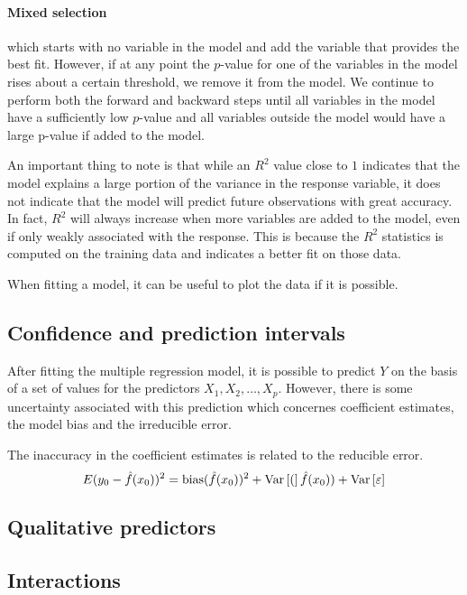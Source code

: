 \paragraph*{Mixed selection} which starts with no variable in the model and add the variable that provides the best fit. However, if at any point the $p$-value for one of the variables in the model rises about a certain threshold, we remove it from the model. We continue to perform both the forward and backward steps until all variables in the model have a sufficiently low $p$-value and all variables outside the model would have a large p-value if added to the model.

An important thing to note is that while an $R^2$ value close to $1$ indicates that the model explains a large portion of the variance in the response variable, it does not indicate that the model will predict future observations with great accuracy. In fact, $R^2$ will always increase when more variables are added to the model, even if only weakly associated with the response. This is because the $R^2$ statistics is computed on the training data and indicates a better fit on those data.

When fitting a model, it can be useful to plot the data if it is possible.

\subsection*{Confidence and prediction intervals}
After fitting the multiple regression model, it is possible to predict $Y$ on the basis of a set of values for the predictors $X_1, X_2, \dots, X_p$. However, there is some uncertainty associated with this prediction which concernes coefficient estimates, the model bias and the irreducible error.

The inaccuracy in the coefficient estimates is related to the reducible error.
\[
    E(y_0 - \hat{f}(x_0))^2 = \text{bias}(\hat{f}(x_0))^2 + \text{Var}\left[(\right]\hat{f}(x_0)) + \text{Var}\left[\varepsilon\right]
\]



\subsection*{Qualitative predictors}

\subsection*{Interactions}

